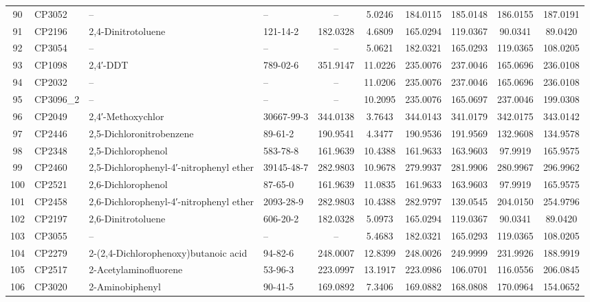 \begin{longtable}{clllcccccc}
90 & CP3052 & – & – & – & 5.0246 & 184.0115 & 185.0148 & 186.0155 & 187.0191 \\ 
91 & CP2196 & 2,4-Dinitrotoluene & 121-14-2 & 182.0328 & 4.6809 & 165.0294 & 119.0367 & 90.0341 & 89.0420 \\ 
92 & CP3054 & – & – & – & 5.0621 & 182.0321 & 165.0293 & 119.0365 & 108.0205 \\ 
93 & CP1098 & 2,4′-DDT & 789-02-6 & 351.9147 & 11.0226 & 235.0076 & 237.0046 & 165.0696 & 236.0108 \\ 
94 & CP2032 & – & – & – & 11.0206 & 235.0076 & 237.0046 & 165.0696 & 236.0108 \\ 
95 & CP3096\_2 & – & – & – & 10.2095 & 235.0076 & 165.0697 & 237.0046 & 199.0308 \\ 
96 & CP2049 & 2,4′-Methoxychlor\smash{\textsuperscript{\textdaggerdbl}} & 30667-99-3 & 344.0138 & 3.7643 & 344.0143 & 341.0179 & 342.0175 & 343.0142 \\ 
97 & CP2446 & 2,5-Dichloronitrobenzene & 89-61-2 & 190.9541 & 4.3477 & 190.9536 & 191.9569 & 132.9608 & 134.9578 \\ 
98 & CP2348 & 2,5-Dichlorophenol & 583-78-8 & 161.9639 & 10.4388 & 161.9633 & 163.9603 & 97.9919 & 165.9575 \\ 
99 & CP2460 & 2,5-Dichlorophenyl-4′-nitrophenyl ether & 39145-48-7 & 282.9803 & 10.9678 & 279.9937 & 281.9906 & 280.9967 & 296.9962 \\ 
100 & CP2521 & 2,6-Dichlorophenol & 87-65-0 & 161.9639 & 11.0835 & 161.9633 & 163.9603 & 97.9919 & 165.9575 \\ 
101 & CP2458 & 2,6-Dichlorophenyl-4′-nitrophenyl ether\smash{\textsuperscript{\textdaggerdbl}} & 2093-28-9 & 282.9803 & 10.4388 & 282.9797 & 139.0545 & 204.0150 & 254.9796 \\ 
102 & CP2197 & 2,6-Dinitrotoluene & 606-20-2 & 182.0328 & 5.0973 & 165.0294 & 119.0367 & 90.0341 & 89.0420 \\ 
103 & CP3055 & – & – & – & 5.4683 & 182.0321 & 165.0293 & 119.0365 & 108.0205 \\ 
104 & CP2279 & 2-(2,4-Dichlorophenoxy)butanoic acid & 94-82-6 & 248.0007 & 12.8399 & 248.0026 & 249.9999 & 231.9926 & 188.9919 \\ 
105 & CP2517 & 2-Acetylaminofluorene & 53-96-3 & 223.0997 & 13.1917 & 223.0986 & 106.0701 & 116.0556 & 206.0845 \\ 
106 & CP3020 & 2-Aminobiphenyl\smash{\textsuperscript{\textdaggerdbl}} & 90-41-5 & 169.0892 & 7.3406 & 169.0882 & 168.0808 & 170.0964 & 154.0652 \\ 

\end{longtable}
